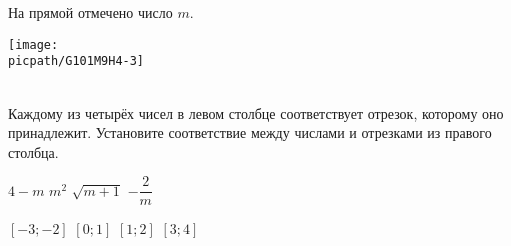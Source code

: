 \begin{homework}[number=4]
\begin{listofex}
		
		
		\item На прямой отмечено число \(m\). \\
		\begin{minipage}[t]{0.8\linewidth}
			\texttt{[image: \\picpath/G101M9H4-3]}
		\end{minipage}
		\\
		Каждому из четырёх чисел в левом столбце соответствует отрезок, которому оно принадлежит. Установите соответствие между числами и отрезками из правого столбца.
		\\
		\begin{minipage}[t]{0.4\linewidth}
			\begin{tasks}
				\task \(4-m \)
				\task \(m^2 \)
				\task \( \sqrt{m+1}\)
				\task \( -\dfrac{ 2 }{ m } \)
			\end{tasks}
		\end{minipage}
		\begin{minipage}[t]{0.4\linewidth}
			\begin{tasks}
				\task \( [-3;-2] \)
				\task \( [0;1] \)
				\task \( [1;2] \)
				\task \( [3;4] \)
			\end{tasks}
		\end{minipage}
		

\end{listofex}
\end{homework}
